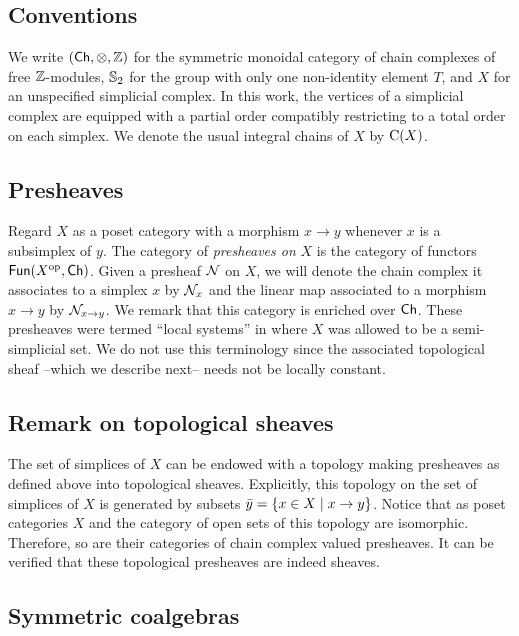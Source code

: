 
\subsection{Conventions}

We write $(\mathsf{Ch}, \otimes, \mathbb{Z})$ for the symmetric monoidal category of chain complexes of free $\mathbb{Z}$-modules, $\mathbb{S}_2$ for the group with only one non-identity element $T$, and $X$ for an unspecified simplicial complex.
In this work, the vertices of a simplicial complex are equipped with a partial order compatibly restricting to a total order on each simplex.
We denote the usual integral chains of $X$ by $\operatorname{C}(X)$.

\subsection{Presheaves}\label{ss:presheaves}

Regard $X$ as a poset category with a morphism $x \to y$ whenever $x$ is a subsimplex of $y$.
The category of \textit{presheaves on} $X$ is the category of functors $\mathsf{Fun}(X^{\mathrm{op}}, \mathsf{Ch})$.
Given a presheaf $\mathcal{N}$ on $X$, we will denote the chain complex it associates to a simplex $x$ by $\mathcal{N}_x$ and the linear map associated to a morphism $x \to y$ by $\mathcal{N}_{x \to y}$.
We remark that this category is enriched over $\mathsf{Ch}$.
These presheaves were termed ``local systems'' in \cite{ranicki1990assembly} where $X$ was allowed to be a semi-simplicial set.
We do not use this terminology since the associated topological sheaf --which we describe next-- needs not be locally constant.

\subsection{Remark on topological sheaves}\label{ss:topological sheaf}

The set of simplices of $X$ can be endowed with a topology making presheaves as defined above into topological sheaves.
Explicitly, this topology on the set of simplices of $X$ is generated by subsets $\bar y = \{x \in X \mid x \to y\}$.
Notice that as poset categories $X$ and the category of open sets of this topology are isomorphic.
Therefore, so are their categories of chain complex valued presheaves.
It can be verified that these topological presheaves are indeed sheaves.

\subsection{Symmetric coalgebras}

